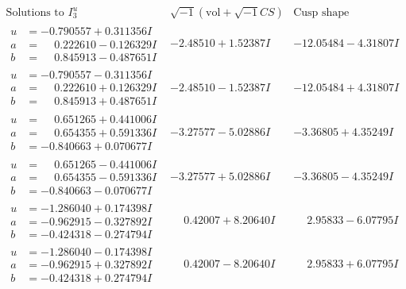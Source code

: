 \documentclass[1p]{elsarticle_modified}
\theoremstyle{definition}
\newcommand{\I}{\sqrt{-1}}
\begin{document}
$$\begin{array}{c|c|c}  
\text{Solutions to }I^u_{3}& \I (\text{vol} + \sqrt{-1}CS) & \text{Cusp shape}\\
 \hline 
\begin{aligned}
u &= -0.790557 + 0.311356 I \\
a &= \phantom{-}0.222610 - 0.126329 I \\
b &= \phantom{-}0.845913 - 0.487651 I\end{aligned}
 & -2.48510 + 1.52387 I & -12.05484 - 4.31807 I \\ \hline\begin{aligned}
u &= -0.790557 - 0.311356 I \\
a &= \phantom{-}0.222610 + 0.126329 I \\
b &= \phantom{-}0.845913 + 0.487651 I\end{aligned}
 & -2.48510 - 1.52387 I & -12.05484 + 4.31807 I \\ \hline\begin{aligned}
u &= \phantom{-}0.651265 + 0.441006 I \\
a &= \phantom{-}0.654355 + 0.591336 I \\
b &= -0.840663 + 0.070677 I\end{aligned}
 & -3.27577 - 5.02886 I & -3.36805 + 4.35249 I \\ \hline\begin{aligned}
u &= \phantom{-}0.651265 - 0.441006 I \\
a &= \phantom{-}0.654355 - 0.591336 I \\
b &= -0.840663 - 0.070677 I\end{aligned}
 & -3.27577 + 5.02886 I & -3.36805 - 4.35249 I \\ \hline\begin{aligned}
u &= -1.286040 + 0.174398 I \\
a &= -0.962915 - 0.327892 I \\
b &= -0.424318 - 0.274794 I\end{aligned}
 & \phantom{-}0.42007 + 8.20640 I & \phantom{-}2.95833 - 6.07795 I \\ \hline\begin{aligned}
u &= -1.286040 - 0.174398 I \\
a &= -0.962915 + 0.327892 I \\
b &= -0.424318 + 0.274794 I\end{aligned}
 & \phantom{-}0.42007 - 8.20640 I & \phantom{-}2.95833 + 6.07795 I \\ \hline\begin{aligned}

\end{aligned}
\end{array}$$
\end{document}
